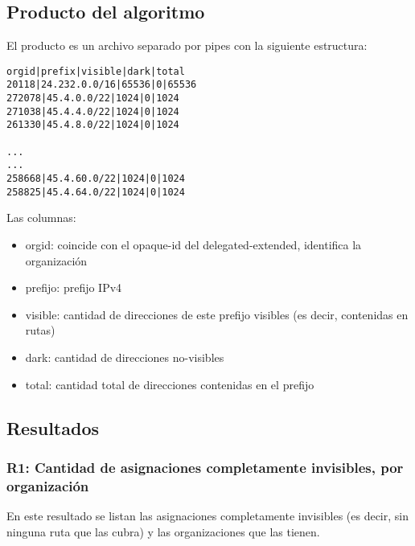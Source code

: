 \documentclass[11pt]{article}
\providecommand{\tightlist}{%
      \setlength{\itemsep}{0pt}\setlength{\parskip}{0pt}}
\begin{document}
\hypertarget{producto-del-algoritmo}{%
\subsection{Producto del algoritmo}\label{producto-del-algoritmo}}

El producto es un archivo separado por pipes con la siguiente
estructura:

\begin{verbatim}
orgid|prefix|visible|dark|total
20118|24.232.0.0/16|65536|0|65536
272078|45.4.0.0/22|1024|0|1024
271038|45.4.4.0/22|1024|0|1024
261330|45.4.8.0/22|1024|0|1024

...
...
258668|45.4.60.0/22|1024|0|1024
258825|45.4.64.0/22|1024|0|1024
\end{verbatim}

Las columnas:

\begin{itemize}
\tightlist
\item
  orgid: coincide con el opaque-id del delegated-extended, identifica la
  organización
\item
  prefijo: prefijo IPv4
\item
  visible: cantidad de direcciones de este prefijo visibles (es decir,
  contenidas en rutas)
\item
  dark: cantidad de direcciones no-visibles
\item
  total: cantidad total de direcciones contenidas en el prefijo
\end{itemize}

    \hypertarget{resultados}{%
\subsection{Resultados}\label{resultados}}

\hypertarget{r1-cantidad-de-asignaciones-completamente-invisibles-por-organizaciuxf3n}{%
\subsubsection{R1: Cantidad de asignaciones completamente invisibles,
por
organización}\label{r1-cantidad-de-asignaciones-completamente-invisibles-por-organizaciuxf3n}}

En este resultado se listan las asignaciones completamente invisibles
(es decir, sin ninguna ruta que las cubra) y las organizaciones que las
tienen.
\end{document}
